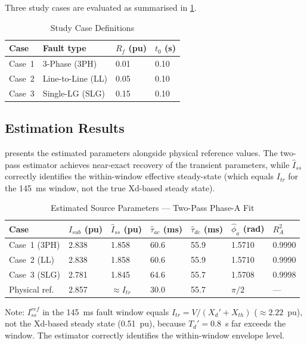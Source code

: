 \documentclass[12pt, a4paper]{article}
\theoremstyle{definition}
\theoremstyle{plain}
\begin{document}
Three study cases are evaluated as summarised in \cref{tab:studycases}.

\begin{table}[h]
\centering
\caption{Study Case Definitions}
\label{tab:studycases}
\begin{tabular}{llll}
\toprule
\textbf{Case} & \textbf{Fault type} & \textbf{$R_f$ (pu)} & \textbf{$t_0$ (s)} \\
\midrule
Case~1 & 3-Phase (3PH)         & 0.01 & 0.10 \\
Case~2 & Line-to-Line (LL)     & 0.05 & 0.10 \\
Case~3 & Single-LG (SLG)       & 0.15 & 0.10 \\
\bottomrule
\end{tabular}
\end{table}

\subsection{Estimation Results}
\label{sec:results:estimation}

 presents the estimated parameters alongside physical
reference values.  The two-pass estimator achieves near-exact recovery of the
transient parameters, while $\hat{I}_{ss}$ correctly identifies the
within-window effective steady-state (which equals $I_{tr}$ for the 145~ms
window, not the true Xd-based steady state).

\begin{table}[h]
\centering
\caption{Estimated Source Parameters — Two-Pass Phase-A Fit}
\label{tab:theta_hat}
\begin{tabular}{lllllll}
\toprule
\textbf{Case} &
$\hat{I}_{sub}$ (pu) & $\hat{I}_{ss}$ (pu) &
$\hat{\tau}_{ac}$ (ms) & $\hat{\tau}_{dc}$ (ms) &
$\hat{\phi}_a$ (rad) & $R^2_A$ \\
\midrule
Case~1 (3PH)  & 2.838 & 1.858 & 60.6  & 55.9 & 1.5710 & 0.9990 \\
Case~2 (LL)   & 2.838 & 1.858 & 60.6  & 55.9 & 1.5710 & 0.9990 \\
Case~3 (SLG)  & 2.781 & 1.845 & 64.6  & 55.7 & 1.5708 & 0.9998 \\
\midrule
Physical ref. & 2.857 & $\approx\!I_{tr}$ & 30.0 & 55.7 & $\pi/2$ & — \\
\bottomrule
\end{tabular}
\vspace{2pt}
{\footnotesize Note: $I_{ss}^{ref}$ in the 145~ms fault window equals $I_{tr} = V/(X_d' + X_{th})$
($\approx 2.22$~pu), not the Xd-based steady state (0.51~pu), because $T_d' = 0.8$~s
far exceeds the window.  The estimator correctly identifies the within-window envelope level.}
\end{table}
\end{document}
